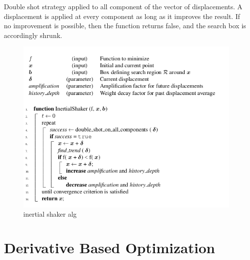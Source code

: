 \documentclass[11pt]{article}
\begin{document}
Double shot strategy applied to all component of the vector of displacements. A displacement
is applied at every component as long as it improves the result. If no improvement is possible, then the function returns false, and the search box is accordingly shrunk.

\begin{figure}
\includegraphics[scale=0.60]{is}
\caption{inertial shaker alg}
\centering
\end{figure}


\section{Derivative Based Optimization}
\end{document}
